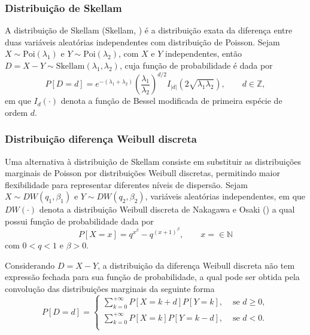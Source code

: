 \documentclass[12pt,a4paper]{article}\usepackage[]{graphicx}\usepackage[]{xcolor}
\begin{document}
\subsubsection{Distribuição de Skellam}\label{sec:skel}
A distribuição de Skellam (Skellam, \citeyear{skellan1946}) é a distribuição exata da diferença entre duas variáveis aleatórias independentes com distribuição de Poisson. Sejam $X\sim\text{Poi}(\lambda_1)$ e $Y\sim\text{Poi}(\lambda_2)$, com \(X\) e \(Y\) independentes, então $D=X-Y\sim\text{Skellam}(\lambda_1,\lambda_2)$, cuja função de probabilidade é dada por
\[
P[D=d]=
e^{-(\lambda_1+\lambda_2)}
\left(
\frac{\lambda_1}{\lambda_2}
\right)^{d/2}
I_{|d|}
\left(
2\sqrt{\lambda_1\lambda_2}
\right),
\qquad
d\in\mathbb{Z},
\]
em que \(I_{d}(\cdot)\) denota a função de Bessel modificada de primeira espécie de ordem \(d\).


\subsubsection{Distribuição diferença Weibull discreta}\label{sec:weib}

Uma alternativa à distribuição de Skellam consiste em substituir as distribuições marginais de Poisson por distribuições Weibull discretas, permitindo maior flexibilidade para representar diferentes níveis de dispersão. Sejam $X\sim DW(q_1,\beta_1)$ e $Y\sim DW(q_2,\beta_2)$, variáveis aleatórias independentes, em que \(DW(\cdot)\) denota a distribuição Weibull discreta de Nakagawa e Osaki (\citeyear{Nakagawa1975}) a qual possui função de probabilidade dada por
\[
P[X=x]=q^{x^{\beta}}-q^{(x+1)^{\beta}},\qquad x=\in\mathbb{N}
\]
com $0<q<1$ e $\beta>0$. 

Considerando $D=X-Y$, a distribuição da diferença Weibull discreta não tem expressão fechada para sua função de probabilidade, a qual pode ser obtida pela convolução das distribuições marginais da seguinte forma
\[
P[D=d]=\begin{cases}
\sum\limits_{k=0}^{+\infty}
P[X=k+d]
P[Y=k],&\text{ se }d\geq0,\\
\sum\limits_{k=0}^{+\infty}
P[X=k]
P[Y=k-d],&\text{ se }d<0.\\
\end{cases}
\]
\end{document}
